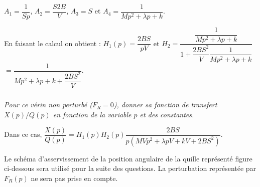 \documentclass[10pt,fleqn]{article} %
\begin{document}
\begin{multicols}{2}
\begin{corrige}
$A_1=\dfrac{1}{Sp}$,  $A_2 = \dfrac{S2B}{V} $,  $A_3 = S$  et $A_4 = \dfrac{1}{Mp^2  +\lambda p  + k}$.


En faisant le calcul on obtient : 
$H_1(p)=\dfrac{2BS}{pV}  $ et $H_2 = \dfrac{\dfrac{1}{Mp^2  +\lambda p  + k}}{1+ \dfrac{2BS^2}{V}\dfrac{1}{Mp^2  +\lambda p  + k} }$  $= \dfrac{1}{Mp^2  +\lambda p  + k+ \dfrac{2BS^2}{V} }$.

\end{corrige}
\else
\fi

\subparagraph{}\textit{Pour ce vérin non perturbé ($F_R=0$), donner sa fonction de transfert $X(p)/Q(p)$ en fonction de la variable $p$ et des constantes.}
\ifprof
\begin{corrige}
Dans ce cas, $\dfrac{X(p)}{Q(p)}=H_1(p)H_2(p)\dfrac{2BS}{p\left(MVp^2  +\lambda pV  + kV+ 2BS^2\right) }$.
\end{corrige}
\else
\fi

\ifprof
\else
Le schéma d’asservissement de la position angulaire de la quille représenté figure ci-dessous sera utilisé
pour la suite des questions. La perturbation représentée par $F_R(p)$ ne sera pas prise en compte.

\footnotesize
\begin{center}
\end{center}
\end{multicols}
\end{document}
